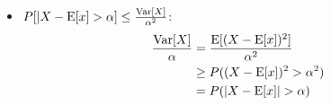 \begin{itemize}
\item{$P[|X-\mathrm{E}[x]>\alpha] \leq \frac{\mathrm{Var}[X]}{\alpha^2}$:
  \begin{align*}
    \frac{\Var[X]}{\alpha}
     &= \frac{\E[(X-\E[x])^2]}{\alpha^2} \\
     &\ge P((X-\E[x])^2>\alpha^2) \\
     &= P(|X-\E[x]|>\alpha)
  \end{align*}
}
\end{itemize}
